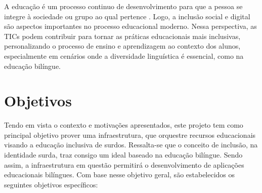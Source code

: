 A educação é um processo continuo de desenvolvimento para que a pessoa se integre à sociedade ou grupo ao qual pertence \cite{Cilli2017,Quadros2019}. Logo, a inclusão social e digital são aspectos importantes no processo educacional moderno. Nessa perspectiva, as TICs podem contribuir para tornar as práticas educacionais mais inclusivas, personalizando o processo de ensino e aprendizagem ao contexto dos alunos, especialmente em cenários onde a diversidade linguística é essencial, como na educação bilíngue.

\section{Objetivos}

Tendo em vista o contexto e motivações apresentados, este projeto tem como principal objetivo prover uma infraestrutura, que orquestre recursos educacionais visando a educação inclusiva de surdos. Ressalta-se que o conceito de inclusão, na identidade surda, traz consigo um ideal baseado na educação bilíngue. Sendo assim, a infraestrutura em questão permitirá o desenvolvimento de aplicações educacionais bilíngues. %
Com base nesse objetivo geral, são estabelecidos os seguintes objetivos específicos:

